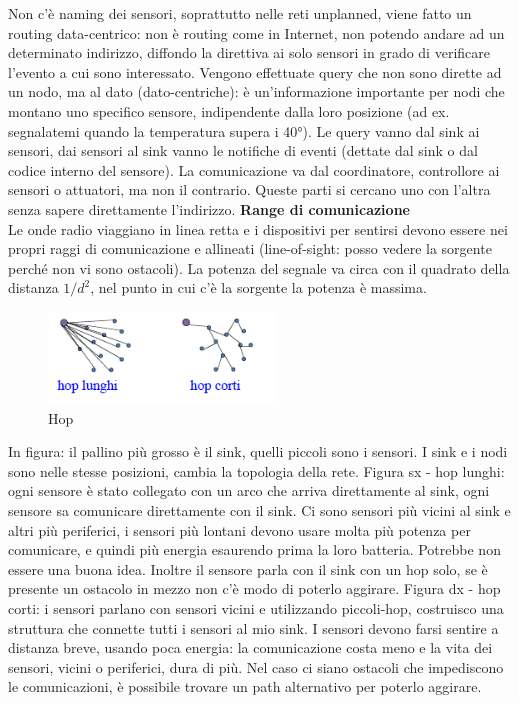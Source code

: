 \documentclass[12pt,italian]{report}
\begin{document}
\noindent Non c'è naming dei sensori, soprattutto nelle reti unplanned, viene fatto un routing data-centrico: non è routing come in Internet, non potendo andare ad un determinato indirizzo, diffondo la direttiva ai solo sensori in grado di verificare l'evento a cui sono interessato. 
\bigbreak
Vengono effettuate query che non sono dirette ad un nodo, ma al dato (dato-centriche): è un'informazione importante per nodi che montano uno specifico sensore, indipendente dalla loro posizione (ad ex. segnalatemi quando la temperatura supera i 40°). 
\bigbreak
Le query vanno dal sink ai sensori, dai sensori al sink vanno le notifiche di eventi (dettate dal sink o dal codice interno del sensore). La comunicazione va dal coordinatore, controllore ai sensori o attuatori, ma non il contrario. Queste parti si cercano uno con l'altra senza sapere direttamente l'indirizzo.
\bigbreak
\noindent \textbf{Range di comunicazione} \\
Le onde radio viaggiano in linea retta e i dispositivi per sentirsi devono essere nei propri raggi di comunicazione e allineati (line-of-sight: posso vedere la sorgente perché non vi sono ostacoli). La potenza del segnale va circa con il quadrato della distanza $1/d^2$, nel punto in cui c'è la sorgente la potenza è massima.
\begin{figure}[h]
	\centering
    \includegraphics[width=60mm]{img/range.PNG}
    \caption{Hop}
    \label{fig:hops}
\end{figure}
\bigbreak
In figura: il pallino più grosso è il sink, quelli piccoli sono i sensori. I sink e i nodi sono nelle stesse posizioni, cambia la topologia della rete.
\bigbreak
Figura sx - hop lunghi: ogni sensore è stato collegato con un arco che arriva direttamente al sink, ogni sensore sa comunicare direttamente con il sink. Ci sono sensori più vicini al sink e altri più periferici, i sensori più lontani devono usare molta più potenza per comunicare, e quindi più energia esaurendo prima la loro batteria. Potrebbe non essere una buona idea. Inoltre il sensore parla con il sink con un hop solo, se è presente un ostacolo in mezzo non c'è modo di poterlo aggirare. 
\bigbreak
Figura dx - hop corti: i sensori parlano con sensori vicini e utilizzando piccoli-hop, costruisco una struttura che connette tutti i sensori al mio sink. I sensori devono farsi sentire a distanza breve, usando poca energia: la comunicazione costa meno e la vita dei sensori, vicini o periferici, dura di più. Nel caso ci siano ostacoli che impediscono le comunicazioni, è possibile trovare un path alternativo per poterlo aggirare. 
\end{document}
